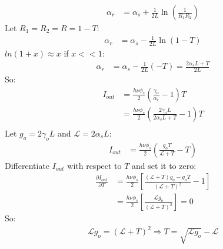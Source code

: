 \documentclass[11pt]{article}
\begin{document}
\begin{align*}
    \alpha_r &= \alpha_s + \frac{1}{2L} \ln \left( \frac{1}{R_1 R_2} \right)
\end{align*}
Let $R_1 = R_2 = R = 1 - T$:
\begin{align*}
    \alpha_r &= \alpha_s - \frac{1}{2L} \ln(1 - T)
\end{align*}
$ln(1+x) \approx x$ if $x << 1$:
\begin{align*}
    \alpha_r &= \alpha_s - \frac{1}{2L} (-T) = \frac{2 \alpha_s L + T}{2L}
\end{align*}
So:
\begin{align*}
    I_{out} &= \frac{h \nu \phi_s}{2} \left( \frac{\gamma_o}{\alpha_r} - 1 \right) T \\
    &= \frac{h \nu \phi_s}{2} \left( \frac{2\gamma_o L}{2 \alpha_s L + T} - 1 \right) T \\ 
\end{align*}
Let $g_o = 2\gamma_o L$ and $\mathscr{L} = 2 \alpha_s L$:
\begin{align*}
    I_{out} &= \frac{h \nu \phi_s}{2} \left( \frac{g_o T}{\mathscr{L} + T} - T \right)
\end{align*}
Differentiate $I_{out}$ with respect to $T$ and set it to zero:
\begin{align*}
    \frac{\partial I_{out}}{\partial T} &= \frac{h \nu \phi_s}{2} \left[ \frac{(\mathscr{L} + T)g_o - g_o T}{(\mathscr{L} + T)^2} - 1 \right]  \\
    &= \frac{h \nu \phi_s}{2} \left[ \frac{\mathscr{L}g_o}{(\mathscr{L} + T)^2} \right] = 0 
\end{align*}
So:
\begin{align*}
    \mathscr{L}g_o = (\mathscr{L} + T)^2 \Rightarrow T = \sqrt{\mathscr{L}g_o} - \mathscr{L}
\end{align*}
\end{document}
